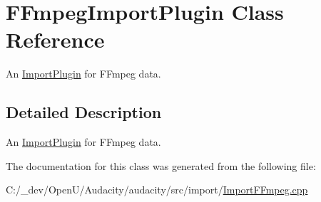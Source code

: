 \hypertarget{class_f_fmpeg_import_plugin}{}\section{F\+Fmpeg\+Import\+Plugin Class Reference}
\label{class_f_fmpeg_import_plugin}


An \hyperlink{class_import_plugin}{Import\+Plugin} for F\+Fmpeg data.  




\subsection{Detailed Description}
An \hyperlink{class_import_plugin}{Import\+Plugin} for F\+Fmpeg data. 

The documentation for this class was generated from the following file\+:\begin{DoxyCompactItemize}
\item 
C\+:/\+\_\+dev/\+Open\+U/\+Audacity/audacity/src/import/\hyperlink{_import_f_fmpeg_8cpp}{Import\+F\+Fmpeg.\+cpp}\end{DoxyCompactItemize}
